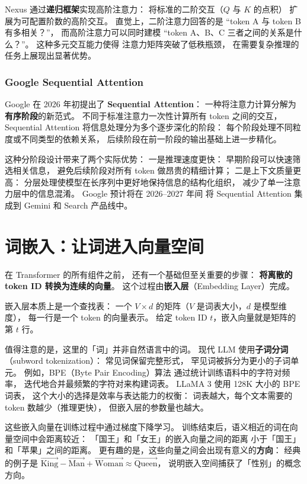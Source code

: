 Nexus 通过\textbf{递归框架}实现高阶注意力：
将标准的二阶交互（$Q$ 与 $K$ 的点积）
扩展为可配置阶数的高阶交互。
直觉上，二阶注意力回答的是
“token A 与 token B 有多相关？”，
而高阶注意力可以同时建模
“token A、B、C 三者之间的关系是什么？”。
这种多元交互能力使得
注意力矩阵突破了低秩瓶颈，
在需要复杂推理的任务上展现出显著优势。

\subsubsection{Google Sequential Attention}

Google 在 2026 年初提出了 \textbf{Sequential Attention}：
一种将注意力计算分解为\textbf{有序阶段}的新范式。
不同于标准注意力一次性计算所有 token 之间的交互，
Sequential Attention 将信息处理分为多个逐步深化的阶段：
每个阶段处理不同粒度或不同类型的依赖关系，
后续阶段在前一阶段的输出基础上进一步精化。

这种分阶段设计带来了两个实际优势：
一是推理速度更快：
早期阶段可以快速筛选相关信息，
避免后续阶段对所有 token 做昂贵的精细计算；
二是上下文质量更高：
分层处理使模型在长序列中更好地保持信息的结构化组织，
减少了单一注意力层中的信息混淆。
Google 预计将在 2026--2027 年间
将 Sequential Attention 集成到 Gemini 和 Search 产品线中。

\section{词嵌入：让词进入向量空间}

在 Transformer 的所有组件之前，
还有一个基础但至关重要的步骤：
\textbf{将离散的 token ID 转换为连续的向量}。
这个过程由\textbf{嵌入层}（Embedding Layer）完成。

嵌入层本质上是一个查找表：
一个 $V \times d$ 的矩阵（$V$ 是词表大小，$d$ 是模型维度），
每一行是一个 token 的向量表示。
给定 token ID $t$，嵌入向量就是矩阵的第 $t$ 行。

值得注意的是，这里的「词」并非自然语言中的词。
现代 LLM 使用\textbf{子词分词}（subword tokenization）：
常见词保留完整形式，
罕见词被拆分为更小的子词单元。
例如，BPE（Byte Pair Encoding）算法
通过统计训练语料中的字符对频率，
迭代地合并最频繁的字符对来构建词表。
LLaMA 3 使用 128K 大小的 BPE 词表，
这个大小的选择是效率与表达能力的权衡：
词表越大，每个文本需要的 token 数越少（推理更快），
但嵌入层的参数量也越大。

这些嵌入向量在训练过程中通过梯度下降学习。
训练结束后，语义相近的词在向量空间中会距离较近：
「国王」和「女王」的嵌入向量之间的距离
小于「国王」和「苹果」之间的距离。
更有趣的是，这些向量之间会出现有意义的\textbf{方向}：
经典的例子是 $\vec{\text{King}} - \vec{\text{Man}} + \vec{\text{Woman}} \approx \vec{\text{Queen}}$，
说明嵌入空间捕获了「性别」的概念方向。

